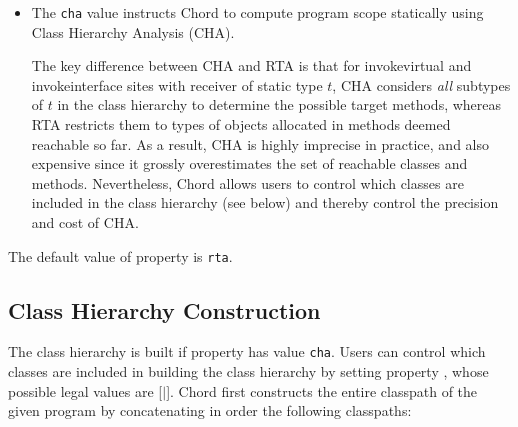 \begin{itemize}
%
%
%
%
\item
The {\tt cha} value instructs Chord to compute program scope
statically using Class Hierarchy Analysis (CHA).

The key difference between CHA and RTA is that for invokevirtual and
invokeinterface sites with receiver of static type $t$, CHA considers
{\it all} subtypes of $t$ in the class hierarchy to determine the
possible target methods, whereas RTA restricts them to types of
objects allocated in methods deemed reachable so far.  As a result,
CHA is highly imprecise in practice, and also expensive since it
grossly overestimates the set of reachable classes and methods.
Nevertheless, Chord allows users to control which classes are
included in the class hierarchy (see below) and thereby control the
precision and cost of CHA.

\end{itemize}
The default value of property  is {\tt rta}.

\subsection{Class Hierarchy Construction}

The class hierarchy is built if property  has
value {\tt cha}.  Users can control which classes are included in
building the class hierarchy by setting property ,
whose possible legal values are [$|$].
Chord first constructs the entire classpath of the given program by
concatenating in order the following classpaths:

